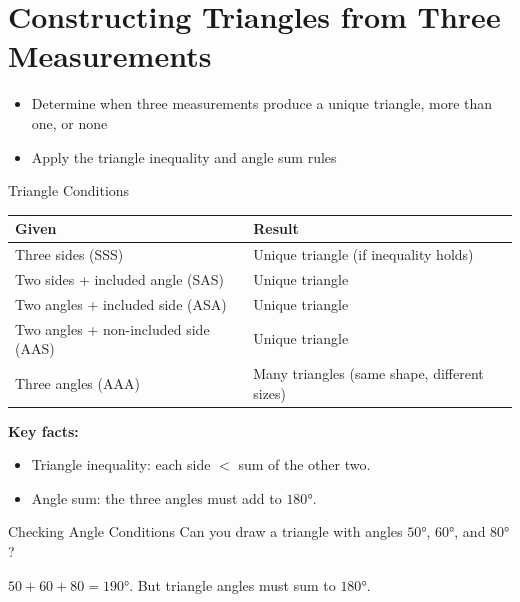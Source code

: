 \section{Constructing Triangles from Three Measurements}

\begin{learningGoals}
\begin{itemize}
    \item Determine when three measurements produce a unique triangle, more than one, or none
    \item Apply the triangle inequality and angle sum rules
\end{itemize}
\end{learningGoals}

\begin{conceptBox}{Triangle Conditions}
\begin{center}
\begin{tabular}{l l}
    \textbf{Given} & \textbf{Result} \\
    \hline
    Three sides (SSS) & Unique triangle (if inequality holds) \\
    Two sides + included angle (SAS) & Unique triangle \\
    Two angles + included side (ASA) & Unique triangle \\
    Two angles + non-included side (AAS) & Unique triangle \\
    Three angles (AAA) & Many triangles (same shape, different sizes) \\
\end{tabular}
\end{center}
\textbf{Key facts:}
\begin{itemize}[leftmargin=*]
    \item Triangle inequality: each side $<$ sum of the other two.
    \item Angle sum: the three angles must add to $180°$.
\end{itemize}
\end{conceptBox}

\begin{workedExample}{Checking Angle Conditions}
Can you draw a triangle with angles $50°$, $60°$, and $80°$?

$50 + 60 + 80 = 190°$. But triangle angles must sum to $180°$.
\end{workedExample}


